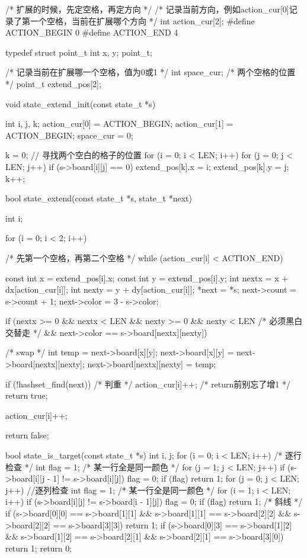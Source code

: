 \begin{Codex}[label=four_adjacent.c]
/* 扩展的时候，先定空格，再定方向 */
/* 记录当前方向，例如action_cur[0]记录了第一个空格，当前在扩展哪个方向
 */
int action_cur[2];
#define ACTION_BEGIN 0
#define ACTION_END 4

typedef struct point_t {
    int x, y;
} point_t;

/* 记录当前在扩展哪一个空格，值为0或1 */
int space_cur;
/* 两个空格的位置 */
point_t extend_pos[2];

void state_extend_init(const state_t *s) {
    int i, j, k;
    action_cur[0] = ACTION_BEGIN;
    action_cur[1] = ACTION_BEGIN;
    space_cur = 0;

    k = 0;
    // 寻找两个空白的格子的位置
    for (i = 0; i < LEN; i++) {
        for (j = 0; j < LEN; j++) {
            if (s->board[i][j] == 0) {
                extend_pos[k].x = i;
                extend_pos[k].y = j;
                k++;
            }
        }
    }
}

bool state_extend(const state_t *s, state_t *next) {
    int i;

    for (i = 0; i < 2; i++) { /* 先第一个空格，再第二个空格 */
        while (action_cur[i] < ACTION_END) {
            const int x = extend_pos[i].x;
            const int y = extend_pos[i].y;
            int nextx = x + dx[action_cur[i]];
            int nexty = y + dy[action_cur[i]];
            *next = *s;
            next->count = s->count + 1;
            next->color = 3 - s->color;

            if (nextx >= 0 && nextx < LEN && nexty >= 0 && nexty < LEN
                    /* 必须黑白交替走 */
                    && next->color == s->board[nextx][nexty]) {
                /* swap */
                {
                    int temp = next->board[x][y];
                    next->board[x][y] = next->board[nextx][nexty];
                    next->board[nextx][nexty] = temp;
                }

                if (!hashset_find(next)) { /* 判重 */
                    action_cur[i]++; /* return前别忘了增1 */
                    return true;
                }
            }
            action_cur[i]++;
        }
    }
    return false;
}

bool state_is_target(const state_t *s) {
    int i, j;
    for (i = 0; i < LEN; i++) {  /* 逐行检查 */
        int flag = 1;  /* 某一行全是同一颜色 */
        for (j = 1; j < LEN; j++)
            if (s->board[i][j - 1] != s->board[i][j])
                flag = 0;
        if (flag)
            return 1;
    }
    for (j = 0; j < LEN; j++) { //逐列检查
        int flag = 1;  /* 某一行全是同一颜色 */
        for (i = 1; i < LEN; i++)
            if (s->board[i][j] != s->board[i - 1][j]) flag = 0;
        if (flag) return 1;
    }
    /* 斜线 */
    if (s->board[0][0] == s->board[1][1] && s->board[1][1] == s->board[2][2]
            && s->board[2][2] == s->board[3][3])
        return 1;
    if (s->board[0][3] == s->board[1][2] && s->board[1][2] == s->board[2][1]
            && s->board[2][1] == s->board[3][0])
        return 1;
    return 0;
}
\end{Codex}

